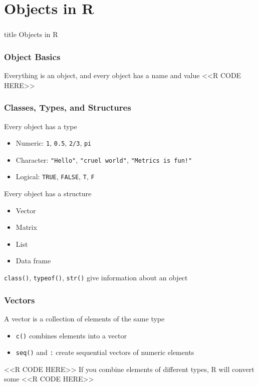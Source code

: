 \documentclass{beamer}
\begin{document}
\section{Objects in R}
\label{objects}
\begin{frame}\frametitle{}
    \vfill
    \centering
    \begin{beamercolorbox}[center]{title}
        \Large Objects in R
    \end{beamercolorbox}
    \vfill
\end{frame}

\begin{frame}[fragile]\frametitle{Object Basics}
    Everything is an object, and every object has a name and value
    <<R CODE HERE>>
\end{frame}

\begin{frame}\frametitle{Classes, Types, and Structures}
    Every object has a type
    \begin{itemize}
        \item Numeric: \texttt{1}, \texttt{0.5}, \texttt{2/3}, \texttt{pi}
        \item Character: \texttt{"Hello"}, \texttt{"cruel world"}, \texttt{"Metrics is fun!"}
        \item Logical: \texttt{TRUE}, \texttt{FALSE}, \texttt{T}, \texttt{F}
    \end{itemize}
    \vspace{2ex}
    Every object has a structure
    \begin{itemize}
        \item Vector
        \item Matrix
        \item List
        \item Data frame
    \end{itemize}
    \vspace{2ex}
    \texttt{class()}, \texttt{typeof()}, \texttt{str()} give information about an object
\end{frame}

\begin{frame}[fragile]\frametitle{Vectors}
    A vector is a collection of elements of the same type
    \begin{itemize}
        \item \texttt{c()} combines elements into a vector
        \item \texttt{seq()} and \texttt{:} create sequential vectors of numeric elements
    \end{itemize}
    <<R CODE HERE>>
    \vspace{2ex} 
    If you combine elements of different types, R will convert some
    <<R CODE HERE>>
\end{frame}
\end{document}
